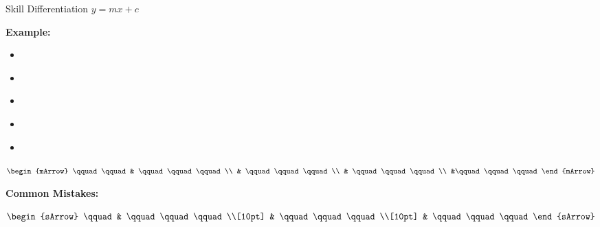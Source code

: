 \clearpage
{}
\begin{boxSkill}{Skill \thenskill \quad Differentiation $y=mx+c$}
    \noindent%

	\textbf{Example:}
	\begin{itemize}[leftmargin=0.8cm]
	     \item[] $\qquad\qquad\qquad    $
	     \item[] $\qquad\qquad\qquad     $
	     \item[] $\qquad\qquad\qquad      $ 
	     \item[] $\qquad\qquad\qquad    $
	     \item[] $\qquad\qquad\qquad  $	 
	\end{itemize}
	
	 $\begin{mArrow}
        \qquad \qquad &    \qquad\qquad\qquad          \\
                      & \qquad\qquad\qquad \\
			          & \qquad\qquad\qquad  \\
			          &\qquad\qquad\qquad
 	 \end{mArrow}$\\[0.5cm]
	 
	
	\tcbline
	
    \textbf{Common Mistakes:}\\[0.6cm]
	\begin{warningEnv}
	    $\begin{sArrow}
	        \qquad   & \qquad\qquad\qquad \\[10pt]
	  	             & \qquad\qquad\qquad                                                                        \\[10pt] 
                     & \qquad\qquad\qquad 				   
		 \end{sArrow}$		   
    \end{warningEnv}
\end{boxSkill}


